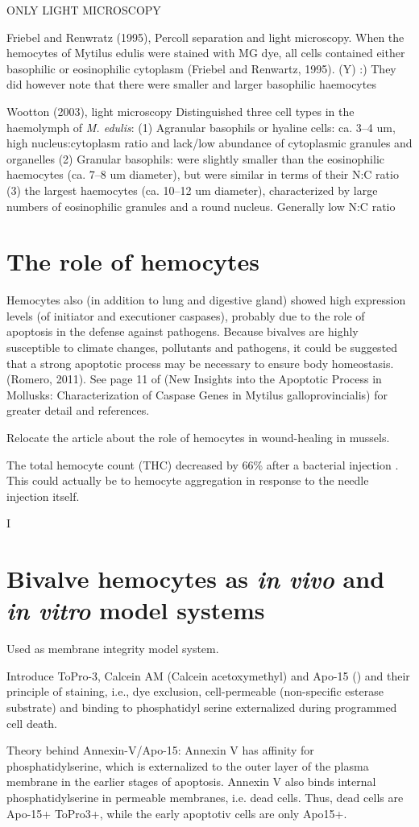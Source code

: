 ONLY LIGHT MICROSCOPY

Friebel and Renwratz (1995), Percoll separation and light microscopy. 
When the hemocytes of Mytilus edulis were stained with MG dye, all cells contained either basophilic or eosinophilic cytoplasm (Friebel and Renwartz, 1995). (Y) :) They did however note that there were smaller and larger basophilic haemocytes

Wootton (2003), light microscopy
Distinguished three cell types in the haemolymph of \emph{M. edulis}:
(1) Agranular basophils or hyaline cells: ca. 3–4 um, high nucleus:cytoplasm ratio and lack/low abundance of cytoplasmic granules and organelles
(2) Granular basophils: were slightly smaller than the eosinophilic haemocytes (ca. 7–8 um diameter), but were similar in terms of their N:C ratio
(3) the largest haemocytes (ca. 10–12 um diameter), characterized by large numbers of eosinophilic granules and a round nucleus. Generally low N:C ratio

\section{The role of hemocytes}
Hemocytes also (in addition to lung and digestive gland) showed high expression levels (of initiator and executioner caspases), probably due to the role of apoptosis in the defense against pathogens. Because bivalves are highly susceptible to climate changes, pollutants and pathogens, it  could be suggested that a strong apoptotic process may be necessary to ensure body homeostasis. (Romero, 2011). See page 11 of (New Insights into the Apoptotic Process in Mollusks: Characterization of Caspase Genes in Mytilus galloprovincialis) for greater detail and references.

Relocate the article about the role of hemocytes in wound-healing in mussels.

The total hemocyte count (THC) decreased by 66\% after a bacterial injection \cite{Parisi2008}. This could actually be to hemocyte aggregation in response to the needle injection itself.

I

\section{Bivalve hemocytes as \emph{in vivo} and \emph{in vitro} model systems}
Used as membrane integrity model system.

Introduce ToPro-3, Calcein AM (Calcein acetoxymethyl) and Apo-15 (\cite{Barth2020}) and their principle of staining, i.e., dye exclusion, cell-permeable (non-specific esterase substrate) and binding to phosphatidyl serine externalized during programmed cell death.

Theory behind Annexin-V/Apo-15: Annexin V
has affinity for phosphatidylserine, which is externalized to the
outer layer of the plasma membrane in the earlier stages of apoptosis. Annexin V also binds internal phosphatidylserine in permeable membranes, i.e. dead cells. Thus, dead cells are Apo-15+ ToPro3+, while the early apoptotiv cells are only Apo15+.